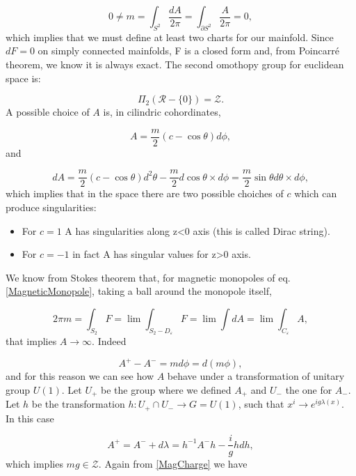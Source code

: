 \begin{equation}
0\neq m=\int_{S^2}\frac{dA}{2\pi}=\int_{\partial S^2}\frac{A}{2\pi}=0,
\end{equation}
which implies that we must define at least two charts for our mainfold.
Since $dF=0$ on simply connected mainfolds, F is a closed form and, from Poincarré theorem, we know it is always exact. The second omothopy group for euclidean space is:

\begin{equation}
\Pi_2\left(\mathcal{R}-\bigl\{0\bigr\}\right)=\mathcal{Z}.
\end{equation}
A possible choice of $A$ is, in cilindric cohordinates,

\begin{equation}
A=\frac{m}{2}\left(c-\cos\theta\right)d\phi,
\end{equation}
and

\begin{equation}
dA=\frac{m}{2}\left(c-\cos\theta\right)d^2\theta-\frac{m}{2}d\cos\theta\times d \phi=\frac{m}{2}\sin\theta d\theta\times d \phi,
\end{equation}
which implies that in the space there are two possible choiches of $c$ which can produce singularities:

\begin{itemize}
\item For $c=1$ A has singularities along z<0 axis (this is called Dirac string).
\item For $c=-1$ in fact A has singular values for z>0 axis.
\end{itemize}
We know from Stokes theorem that, for magnetic monopoles of eq. \eqref{MagneticMonopole}, taking a ball around the monopole itself,

\begin{equation}\label{MagCharge}
2\pi m=\int_{S_2} F=\lim\int_{S_2-D_{\varepsilon}}F=\lim\int dA=\lim\int_{C_{\varepsilon}} A,
\end{equation}
that implies $A\to\infty$. Indeed

\begin{equation}
A^+-A^-=md\phi=d(m\phi),
\end{equation}
and for this reason we can see how $A$ behave under a transformation of unitary group $U(1)$. Let $U_+$ be the group where we defined $A_+$ and $U_-$ the one for $A_-$.
Let $h$ be the transformation $h:U_+\cap U_- \to G=U(1)$, such that $x^i\to e^{ig\lambda(x)}$. In this case

\begin{equation}
A^+=A^-+d\lambda=h^{-1}A^-h-\frac{i}{g}h dh,
\end{equation}
which implies $mg\in \mathcal{Z}$. Again from \eqref{MagCharge} we have

